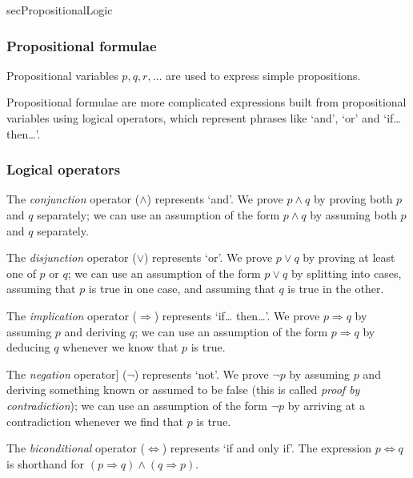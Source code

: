 \begin{tldr}{secPropositionalLogic}

\subsubsection*{Propositional formulae}

\begin{tldrlist}
Propositional variables $p,q,r,\dots$ are used to express simple propositions.

Propositional formulae are more complicated expressions built from propositional variables using logical operators, which represent phrases like `and', `or' and `if\dots{} then\dots{}'.
\end{tldrlist}

\subsubsection*{Logical operators}

\begin{tldrlist}
The \textit{conjunction} operator ($\wedge$) represents `and'. We prove $p \wedge q$ by proving both $p$ and $q$ separately; we can use an assumption of the form $p \wedge q$ by assuming both $p$ and $q$ separately.

The \textit{disjunction} operator ($\vee$) represents `or'. We prove $p \vee q$ by proving at least one of $p$ or $q$; we can use an assumption of the form $p \vee q$ by splitting into cases, assuming that $p$ is true in one case, and assuming that $q$ is true in the other.

The \textit{implication} operator ($\Rightarrow$) represents `if\dots{} then\dots{}'. We prove $p \Rightarrow q$ by assuming $p$ and deriving $q$; we can use an assumption of the form $p \Rightarrow q$ by deducing $q$ whenever we know that $p$ is true.

The \textit{negation} operator] ($\neg$) represents `not'. We prove $\neg p$ by assuming $p$ and deriving something known or assumed to be false (this is called \textit{proof by contradiction}); we can use an assumption of the form $\neg p$ by arriving at a contradiction whenever we find that $p$ is true.

The \textit{biconditional} operator ($\Leftrightarrow$) represents `if and only if'. The expression $p \Leftrightarrow q$ is shorthand for $(p \Rightarrow q) \wedge (q \Rightarrow p)$.
\end{tldrlist}


\end{tldr}
